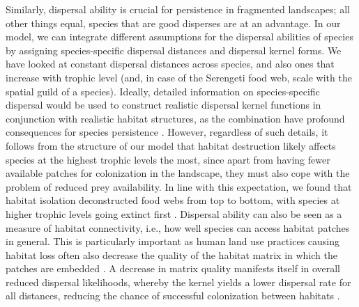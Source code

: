\documentclass[11pt]{article}
\begin{document}
Similarly, dispersal ability is crucial for persistence in fragmented landscapes; all other things equal, species that are good disperses are at an advantage. In our model, we can integrate different assumptions for the dispersal abilities of species by assigning species-specific dispersal distances and dispersal kernel forms. We have looked at constant dispersal distances across species, and also ones that increase with trophic level (and, in case of the Serengeti food web, scale with the spatial guild of a species). Ideally, detailed information on species-specific dispersal would be used to construct realistic dispersal kernel functions in conjunction with realistic habitat structures, as the combination have profound consequences for species persistence \citep{Arevalletal2018}. However, regardless of such details, it follows from the structure of our model that habitat destruction likely affects species at the highest trophic levels the most, since apart from having fewer available patches for colonization in the landscape, they must also cope with the problem of reduced prey availability. In line with this expectation, we found that habitat isolation deconstructed food webs from top to bottom, with species at higher trophic levels going extinct first \citep{Ryser2019, McWilliams2019}. Dispersal ability can also be seen as a measure of habitat connectivity, i.e., how well species can access habitat patches in general. This is particularly important as human land use practices causing habitat loss often also decrease the quality of the habitat matrix in which the patches are embedded \citep{Bonte2012}. A decrease in matrix quality manifests itself in overall reduced dispersal likelihoods, whereby the kernel yields a lower dispersal rate for all distances, reducing the chance of successful colonization between habitats \citep{Eklof2012}. 
\end{document}
